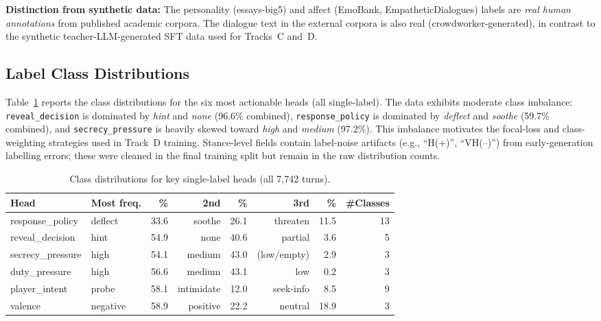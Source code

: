 \documentclass[11pt]{article}
\begin{document}
\textbf{Distinction from synthetic data:} The personality (essays-big5) and affect (EmoBank, EmpatheticDialogues) labels are \textit{real human annotations} from published academic corpora.
The dialogue text in the external corpora is also real (crowdworker-generated), in contrast to the synthetic teacher-LLM-generated SFT data used for Tracks~C and~D.

\subsection{Label Class Distributions}

Table~\ref{tab:label_dist} reports the class distributions for the six most actionable heads (all single-label).
The data exhibits moderate class imbalance: \texttt{reveal\_decision} is dominated by \textit{hint} and \textit{none} (96.6\% combined), \texttt{response\_policy} is dominated by \textit{deflect} and \textit{soothe} (59.7\% combined), and \texttt{secrecy\_pressure} is heavily skewed toward \textit{high} and \textit{medium} (97.2\%).
This imbalance motivates the focal-loss and class-weighting strategies used in Track~D training.
Stance-level fields contain label-noise artifacts (e.g., ``H(+)'', ``VH(--)'') from early-generation labelling errors; these were cleaned in the final training split but remain in the raw distribution counts.

\begin{table}[tp]
\centering
\caption{Class distributions for key single-label heads (all 7,742 turns).}
\label{tab:label_dist}
\footnotesize\setlength{\tabcolsep}{2.5pt}
\begin{tabular}{@{}llrrrrrr@{}}
\toprule
\textbf{Head} & \textbf{Most freq.} & \textbf{\%} & \textbf{2nd} & \textbf{\%} & \textbf{3rd} & \textbf{\%} & \textbf{\#Classes} \\
\midrule
response\_policy  & deflect   & 33.6 & soothe    & 26.1 & threaten   & 11.5 & 13 \\
reveal\_decision   & hint      & 54.9 & none      & 40.6 & partial    &  3.6 & 5  \\
secrecy\_pressure  & high      & 54.1 & medium    & 43.0 & (low/empty)&  2.9 & 3  \\
duty\_pressure     & high      & 56.6 & medium    & 43.1 & low        &  0.2 & 3  \\
player\_intent     & probe     & 58.1 & intimidate& 12.0 & seek-info  &  8.5 & 9  \\
valence           & negative  & 58.9 & positive  & 22.2 & neutral    & 18.9 & 3  \\
\bottomrule
\end{tabular}
\end{table}
\end{document}
